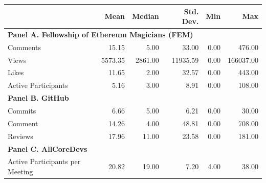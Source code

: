 \begin{tabular}{lrrrrr}
\toprule
 & Mean & Median & Std. Dev. & Min & Max \\
\midrule
\multicolumn{6}{l}{\textbf{Panel A. Fellowship of Ethereum Magicians (FEM)}} \\
Comments & 15.15 & 5.00 & 33.00 & 0.00 & 476.00 \\
Views & 5573.35 & 2861.00 & 11935.59 & 0.00 & 166037.00 \\
Likes & 11.65 & 2.00 & 32.57 & 0.00 & 443.00 \\
Active Participants & 5.16 & 3.00 & 8.91 & 0.00 & 108.00 \\
\midrule
\multicolumn{6}{l}{\textbf{Panel B. GitHub}} \\
Commits & 6.66 & 5.00 & 6.21 & 0.00 & 30.00 \\
Comment & 14.26 & 4.00 & 48.81 & 0.00 & 708.00 \\
Reviews & 17.96 & 11.00 & 23.58 & 0.00 & 181.00 \\
\midrule
\multicolumn{6}{l}{\textbf{Panel C. AllCoreDevs}} \\
Active Participants per Meeting & 20.82 & 19.00 & 7.20 & 4.00 & 38.00 \\
\bottomrule
\end{tabular}
